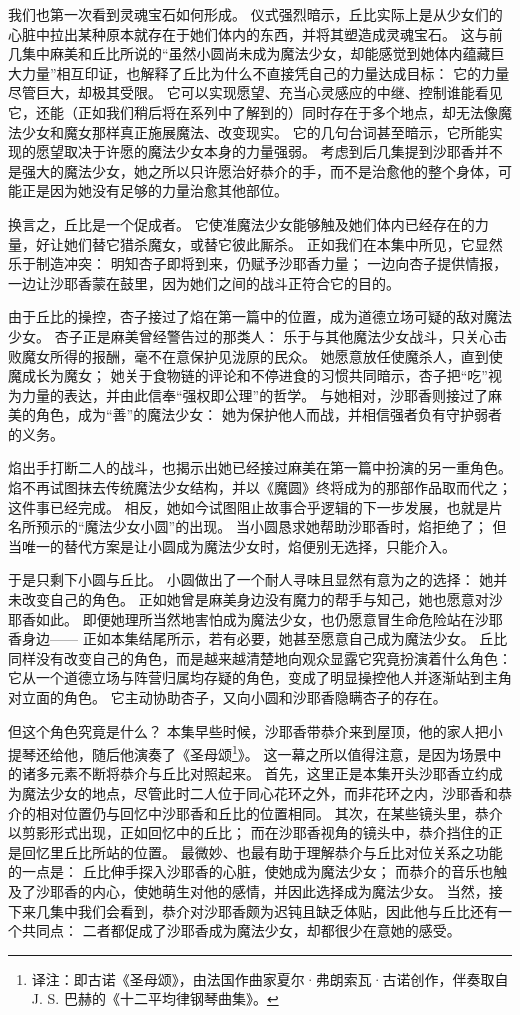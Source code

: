 我们也第一次看到灵魂宝石如何形成。
仪式强烈暗示，丘比实际上是从少女们的心脏中拉出某种原本就存在于她们体内的东西，并将其塑造成灵魂宝石。
这与前几集中麻美和丘比所说的“虽然小圆尚未成为魔法少女，却能感觉到她体内蕴藏巨大力量”相互印证，也解释了丘比为什么不直接凭自己的力量达成目标：
它的力量尽管巨大，却极其受限。
它可以实现愿望、充当心灵感应的中继、控制谁能看见它，还能（正如我们稍后将在系列中了解到的）同时存在于多个地点，却无法像魔法少女和魔女那样真正施展魔法、改变现实。
它的几句台词甚至暗示，它所能实现的愿望取决于许愿的魔法少女本身的力量强弱。
考虑到后几集提到沙耶香并不是强大的魔法少女，她之所以只许愿治好恭介的手，而不是治愈他的整个身体，可能正是因为她没有足够的力量治愈其他部位。

换言之，丘比是一个促成者。
它使准魔法少女能够触及她们体内已经存在的力量，好让她们替它猎杀魔女，或替它彼此厮杀。
正如我们在本集中所见，它显然乐于制造冲突：
明知杏子即将到来，仍赋予沙耶香力量；
一边向杏子提供情报，一边让沙耶香蒙在鼓里，因为她们之间的战斗正符合它的目的。

由于丘比的操控，杏子接过了焰在第一篇中的位置，成为道德立场可疑的敌对魔法少女。
杏子正是麻美曾经警告过的那类人：
乐于与其他魔法少女战斗，只关心击败魔女所得的报酬，毫不在意保护见泷原的民众。
她愿意放任使魔杀人，直到使魔成长为魔女；
她关于食物链的评论和不停进食的习惯共同暗示，杏子把“吃”视为力量的表达，并由此信奉“强权即公理”的哲学。
与她相对，沙耶香则接过了麻美的角色，成为“善”的魔法少女：
她为保护他人而战，并相信强者负有守护弱者的义务。

焰出手打断二人的战斗，也揭示出她已经接过麻美在第一篇中扮演的另一重角色。
焰不再试图抹去传统魔法少女结构，并以《魔圆》终将成为的那部作品取而代之；
这件事已经完成。
相反，她如今试图阻止故事合乎逻辑的下一步发展，也就是片名所预示的“魔法少女小圆”的出现。
当小圆恳求她帮助沙耶香时，焰拒绝了；
但当唯一的替代方案是让小圆成为魔法少女时，焰便别无选择，只能介入。

于是只剩下小圆与丘比。
小圆做出了一个耐人寻味且显然有意为之的选择：
她并未改变自己的角色。
正如她曾是麻美身边没有魔力的帮手与知己，她也愿意对沙耶香如此。
即便她理所当然地害怕成为魔法少女，也仍愿意冒生命危险站在沙耶香身边——
正如本集结尾所示，若有必要，她甚至愿意自己成为魔法少女。
丘比同样没有改变自己的角色，而是越来越清楚地向观众显露它究竟扮演着什么角色：
它从一个道德立场与阵营归属均存疑的角色，变成了明显操控他人并逐渐站到主角对立面的角色。
它主动协助杏子，又向小圆和沙耶香隐瞒杏子的存在。

但这个角色究竟是什么？
本集早些时候，沙耶香带恭介来到屋顶，他的家人把小提琴还给他，随后他演奏了《圣母颂\footnote{%
    译注：即古诺《圣母颂》，由法国作曲家夏尔·弗朗索瓦·古诺创作，伴奏取自 J. S. 巴赫的《十二平均律钢琴曲集》。
}》。
这一幕之所以值得注意，是因为场景中的诸多元素不断将恭介与丘比对照起来。
首先，这里正是本集开头沙耶香立约成为魔法少女的地点，尽管此时二人位于同心花环之外，而非花环之内，沙耶香和恭介的相对位置仍与回忆中沙耶香和丘比的位置相同。
其次，在某些镜头里，恭介以剪影形式出现，正如回忆中的丘比；
而在沙耶香视角的镜头中，恭介挡住的正是回忆里丘比所站的位置。
最微妙、也最有助于理解恭介与丘比对位关系之功能的一点是：
丘比伸手探入沙耶香的心脏，使她成为魔法少女；
而恭介的音乐也触及了沙耶香的内心，使她萌生对他的感情，并因此选择成为魔法少女。
当然，接下来几集中我们会看到，恭介对沙耶香颇为迟钝且缺乏体贴，因此他与丘比还有一个共同点：
二者都促成了沙耶香成为魔法少女，却都很少在意她的感受。

